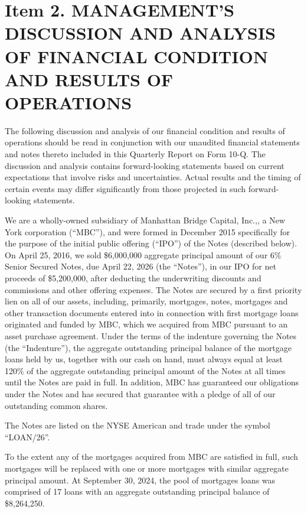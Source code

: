\documentclass{article}
\begin{document}
\section*{Item 2. MANAGEMENT'S DISCUSSION AND ANALYSIS OF FINANCIAL CONDITION AND RESULTS OF OPERATIONS}

The following discussion and analysis of our financial condition and results of operations should be read in conjunction with our unaudited financial statements and notes thereto included in this Quarterly Report on Form 10-Q. The discussion and analysis contains forward-looking statements based on current expectations that involve risks and uncertainties. Actual results and the timing of certain events may differ significantly from those projected in such forward-looking statements.


We are a wholly-owned subsidiary of Manhattan Bridge Capital, Inc.,, a New York corporation (“MBC”), and were formed in December 2015 specifically for the purpose of the initial public offering (“IPO”) of the Notes (described below). On April 25, 2016, we sold \$6,000,000 aggregate principal amount of our 6\% Senior Secured Notes, due April 22, 2026 (the “Notes”), in our IPO for net proceeds of \$5,200,000, after deducting the underwriting discounts and commissions and other offering expenses. The Notes are secured by a first priority lien on all of our assets, including, primarily, mortgages, notes, mortgages and other transaction documents entered into in connection with first mortgage loans originated and funded by MBC, which we acquired from MBC pursuant to an asset purchase agreement. Under the terms of the indenture governing the Notes (the “Indenture”), the aggregate outstanding principal balance of the mortgage loans held by us, together with our cash on hand, must always equal at least 120\% of the aggregate outstanding principal amount of the Notes at all times until the Notes are paid in full. In addition, MBC has guaranteed our obligations under the Notes and has secured that guarantee with a pledge of all of our outstanding common shares.

The Notes are listed on the NYSE American and trade under the symbol “LOAN/26”.

To the extent any of the mortgages acquired from MBC are satisfied in full, such mortgages will be replaced with one or more mortgages with similar aggregate principal amount. At September 30, 2024, the pool of mortgages loans was comprised of 17 loans with an aggregate outstanding principal balance of \$8,264,250.
\end{document}
